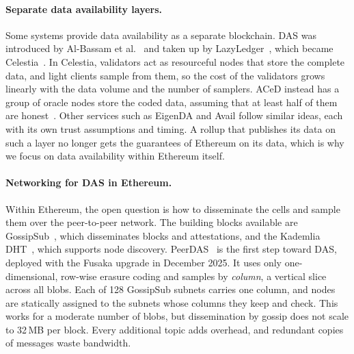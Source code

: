 \paragraph{Separate data availability layers.}
Some systems provide data availability as a separate blockchain.
DAS was introduced by Al-Bassam et al.~\cite{albassam2021fraud} and taken up by LazyLedger~\cite{albassam2019lazyledger}, which became Celestia~\cite{celestia}.
In Celestia, validators act as resourceful nodes that store the complete data, and light clients sample from them, so the cost of the validators grows linearly with the data volume and the number of samplers.
ACeD instead has a group of oracle nodes store the coded data, assuming that at least half of them are honest~\cite{sheng2021aced}.
Other services such as EigenDA and Avail follow similar ideas, each with its own trust assumptions and timing. 
A rollup that publishes its data on such a layer no longer gets the guarantees of Ethereum on its data, which is why we focus on data availability within Ethereum itself.

\paragraph{Networking for DAS in Ethereum.}
Within Ethereum, the open question is how to disseminate the cells and sample them over the peer-to-peer network.
The building blocks available are GossipSub~\cite{vyzovitis2020gossipsub}, which disseminates blocks and attestations, and the Kademlia DHT~\cite{maymounkov2002kademlia}, which supports node discovery.
PeerDAS~\cite{ryan2023peerdas,eip7594} is the first step toward DAS, deployed with the Fusaka upgrade in December 2025. 
It uses only one-dimensional, row-wise erasure coding and samples by \emph{column}, a vertical slice across all blobs.
Each of 128 GossipSub subnets carries one column, and nodes are statically assigned to the subnets whose columns they keep and check.
This works for a moderate number of blobs, but dissemination by gossip does not scale to 32\,MB per block.
Every additional topic adds overhead, and redundant copies of messages waste bandwidth.

